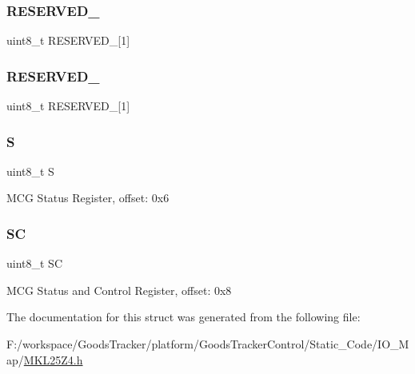 \subsubsection{\texorpdfstring{R\+E\+S\+E\+R\+V\+E\+D\+\_}{RESERVED\_0}}
{\footnotesize\ttfamily uint8\+\_\+t R\+E\+S\+E\+R\+V\+E\+D\+\_\mbox{[}1\mbox{]}}

\mbox{\label{struct_m_c_g___mem_map_a83b2d6f5756a9b0aa609216190380d5f}} 
\subsubsection{\texorpdfstring{R\+E\+S\+E\+R\+V\+E\+D\+\_}{RESERVED\_1}}
{\footnotesize\ttfamily uint8\+\_\+t R\+E\+S\+E\+R\+V\+E\+D\+\_\mbox{[}1\mbox{]}}

\mbox{\label{struct_m_c_g___mem_map_aef44b210af6af7cb40efdfd5469406c0}} 
\subsubsection{\texorpdfstring{S}{S}}
{\footnotesize\ttfamily uint8\+\_\+t S}

M\+CG Status Register, offset\+: 0x6 \mbox{\label{struct_m_c_g___mem_map_a994283cb179a11ded2d18c30c3710802}} 
\subsubsection{\texorpdfstring{SC}{SC}}
{\footnotesize\ttfamily uint8\+\_\+t SC}

M\+CG Status and Control Register, offset\+: 0x8 

The documentation for this struct was generated from the following file\+:\begin{DoxyCompactItemize}
\item 
F\+:/workspace/\+Goods\+Tracker/platform/\+Goods\+Tracker\+Control/\+Static\+\_\+\+Code/\+I\+O\+\_\+\+Map/\hyperlink{_m_k_l25_z4_8h}{M\+K\+L25\+Z4.\+h}\end{DoxyCompactItemize}
